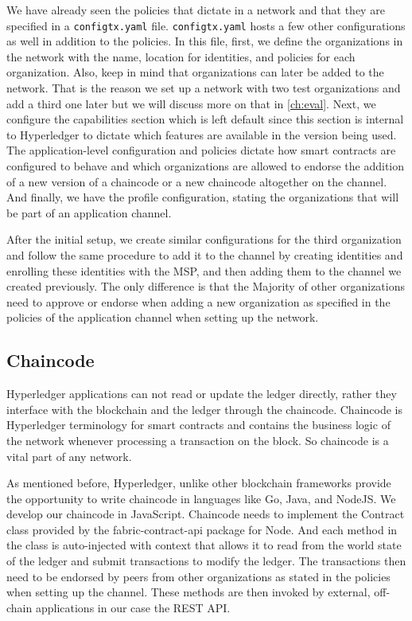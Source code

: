 \bigskip
We have already seen the policies that dictate in a network and that they are specified in a \lstinline{configtx.yaml} file. \lstinline{configtx.yaml} hosts a few other configurations as well in addition to the policies. In this file, first, we define the organizations in the network with the name, location for identities, and policies for each organization. Also, keep in mind that organizations can later be added to the network. That is the reason we set up a network with two test organizations and add a third one later but we will discuss more on that in \ref{ch:eval}. Next, we configure the capabilities section which is left default since this section is internal to Hyperledger to dictate which features are available in the version being used. The application-level configuration and policies dictate how smart contracts are configured to behave and which organizations are allowed to endorse the addition of a new version of a chaincode or a new chaincode altogether on the channel. And finally, we have the profile configuration, stating the organizations that will be part of an application channel.

\bigskip
After the initial setup, we create similar configurations for the third organization and follow the same procedure to add it to the channel by creating identities and enrolling these identities with the MSP, and then adding them to the channel we created previously. The only difference is that the Majority of other organizations need to approve or endorse when adding a new organization as specified in the policies of the application channel when setting up the network.

\subsection{Chaincode}
Hyperledger applications can not read or update the ledger directly, rather they interface with the blockchain and the ledger through the chaincode. Chaincode is Hyperledger terminology for smart contracts and contains the business logic of the network whenever processing a transaction on the block. So chaincode is a vital part of any network.

\bigskip
As mentioned before, Hyperledger, unlike other blockchain frameworks provide the opportunity to write chaincode in languages like Go, Java, and NodeJS. We develop our chaincode in JavaScript. Chaincode needs to implement the Contract class provided by the fabric-contract-api package for Node. And each method in the class is auto-injected with context that allows it to read from the world state of the ledger and submit transactions to modify the ledger. The transactions then need to be endorsed by peers from other organizations as stated in the policies when setting up the channel. These methods are then invoked by external, off-chain applications in our case the REST API.

